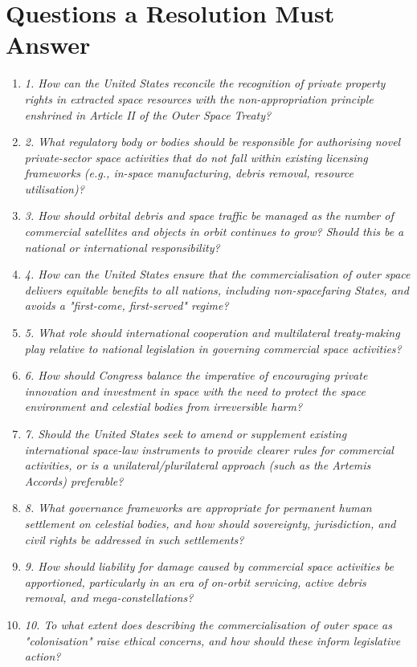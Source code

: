 \section{Questions a Resolution Must Answer}

\begin{enumerate}
  \item \emph{1.     How can the United States reconcile the recognition of private property rights in extracted space resources with the non-appropriation principle enshrined in Article II of the Outer Space Treaty?}
  \item \emph{2.     What regulatory body or bodies should be responsible for authorising novel private-sector space activities that do not fall within existing licensing frameworks (e.g., in-space manufacturing, debris removal, resource utilisation)?}
  \item \emph{3.     How should orbital debris and space traffic be managed as the number of commercial satellites and objects in orbit continues to grow? Should this be a national or international responsibility?}
  \item \emph{4.     How can the United States ensure that the commercialisation of outer space delivers equitable benefits to all nations, including non-spacefaring States, and avoids a "first-come, first-served" regime?}
  \item \emph{5.  What role should international cooperation and multilateral treaty-making play relative to national legislation in governing commercial space activities?}
  \item \emph{6.  How should Congress balance the imperative of encouraging private innovation and investment in space with the need to protect the space environment and celestial bodies from irreversible harm?}
  \item \emph{7.  Should the United States seek to amend or supplement existing international space-law instruments to provide clearer rules for commercial activities, or is a unilateral/plurilateral approach (such as the Artemis Accords) preferable?}
  \item \emph{8.  What governance frameworks are appropriate for permanent human settlement on celestial bodies, and how should sovereignty, jurisdiction, and civil rights be addressed in such settlements?}
  \item \emph{9.  How should liability for damage caused by commercial space activities be apportioned, particularly in an era of on-orbit servicing, active debris removal, and mega-constellations?}
  \item \emph{10.  To what extent does describing the commercialisation of outer space as "colonisation" raise ethical concerns, and how should these inform legislative action?}
\end{enumerate}
